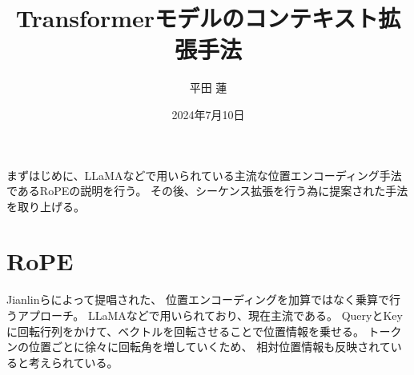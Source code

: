 \documentclass{jsarticle}
\title{
    Transformerモデルのコンテキスト拡張手法
}
\author{平田 蓮}
\date{2024年7月10日}
\begin{document}
\maketitle

まずはじめに、LLaMAなどで用いられている主流な位置エンコーディング手法であるRoPEの説明を行う。
その後、シーケンス拡張を行う為に提案された手法を取り上げる。

\section{RoPE}
    Jianlinら\cite{rope}によって提唱された、
    位置エンコーディングを加算ではなく乗算で行うアプローチ。
    LLaMAなどで用いられており、現在主流である。
    QueryとKeyに回転行列をかけて、ベクトルを回転させることで位置情報を乗せる。
    トークンの位置ごとに徐々に回転角を増していくため、
    相対位置情報も反映されていると考えられている。
\end{document}
